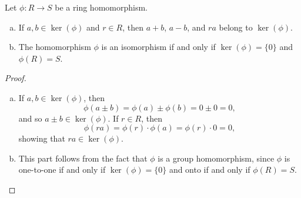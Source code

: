 \begin{proposition}
	Let $\phi:R\to S$ be a ring homomorphism. 
	\begin{enumerate}[(a)]
		\item If $a, b\in \ker(\phi)$ and $r\in R$, then $a+b$, $a-b$, and $ra$ belong to $\ker(\phi)$. 
		\item The homomorphism $\phi$ is an isomorphism if and only if $\ker(\phi) = \{0\}$ and $\phi(R) = S$. 
	\end{enumerate}
\end{proposition}
\begin{proof}
\begin{enumerate}[(a)]
	\item If $a,b\in \ker(\phi)$, then
	\[\phi(a\pm b) = \phi(a) \pm \phi(b) = 0 \pm 0 = 0,\]
	and so $a\pm b\in \ker(\phi)$. If $r\in R$, then 
	\[\phi(ra) = \phi(r) \cdot \phi(a) = \phi(r) \cdot 0 = 0,\]
	showing that $ra\in \ker(\phi)$. 
	\item This part follows from the fact that $\phi$ is a group homomorphism, since $\phi$ is one-to-one if and only if $\ker(\phi) = \{0\}$ and onto if and only if $\phi(R) = S$. 
\end{enumerate}	
\end{proof}

